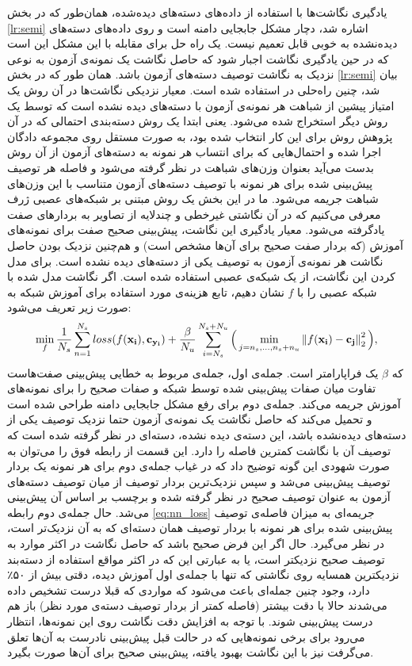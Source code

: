 یادگیری نگاشت‌ها با استفاده از داده‌های دسته‌های دیده‌شده، همان‌طور که در بخش \ref{lr:semi} اشاره شد، دچار مشکل جابجایی دامنه است و  روی داده‌های دسته‌های دیده‌نشده به خوبی قابل تعمیم نیست. یک راه حل برای مقابله با این مشکل این است که در حین یادگیری نگاشت اجبار شود که حاصل نگاشت یک نمونه‌ی آزمون به نوعی نزدیک به نگاشت توصیف دسته‌های آزمون باشد. همان ‌طور که در بخش
\ref{lr:semi}
بیان شد، چنین راه‌حلی در
\cite{Kodirov2015}
استفاده شده است. معیار نزدیکی نگاشت‌ها در آن روش یک امتیاز پیشین از شباهت هر نمونه‌ی آزمون با دسته‌های دیده نشده است که  توسط یک روش دیگر استخراج شده می‌شود. یعنی ابتدا یک روش دسته‌بندی
احتمالی  که در آن پژوهش روش  \cite{lampert09} برای این کار انتخاب شده بود، به صورت مستقل روی مجموعه دادگان اجرا شده و احتمال‌هایی که برای انتساب هر نمونه به دسته‌های آزمون از آن روش بدست می‌آید بعنوان وزن‌های شباهت در نظر گرفته می‌شود و فاصله هر توصیف پیش‌بینی شده برای هر نمونه با توصیف دسته‌های آزمون متناسب با این وزن‌های شباهت جریمه می‌شود.
 ما در این بخش یک روش مبتنی بر شبکه‌های عصبی ژرف معرفی می‌کنیم که در آن نگاشتی غیرخطی و چندلایه از تصاویر به بردارهای صفت یادگرفته می‌شود. معیار یادگیری این نگاشت، پیش‌بینی صحیح صفت برای نمونه‌های آموزش (که بردار صفت صحیح برای آن‌ها مشخص است) و هم‌چنین نزدیک بودن حاصل نگاشت هر نمونه‌ی آزمون به توصیف یکی از دسته‌های دیده نشده است. برای مدل کردن این نگاشت، از یک شبکه‌ی عصبی استفاده شده است. اگر نگاشت مدل شده با شبکه عصبی را با $f$ نشان دهیم، تابع هزینه‌ی مورد استفاده برای آموزش شبکه به صورت زیر تعریف می‌شود:
\begin{equation}
\label{eq:nn_loss}
\min_{f}
\frac{1}{N_s} \sum_{n=1}^{N_s} loss(f(\mathbf{x_i), c_{y_i}}) +
\frac{\beta}{N_u} \sum_{i=N_s}^{N_s+N_u} \Big ( \min_{j=n_s,\ldots,n_s + n_u} \left \lVert f(\mathbf{x_i) - c_j} \right \rVert_2^2 \Big ),
\end{equation}
که $\beta$ یک فراپارامتر است.
جمله‌ی اول، جمله‌ی مربوط به خطایی پیش‌بینی صفت‌هاست تفاوت میان صفات پیش‌بینی شده توسط شبکه و صفات صحیح را برای نمونه‌های آموزش جریمه می‌کند.
 جمله‌ی دوم برای رفع مشکل جابجایی دامنه طراحی شده است و تحمیل می‌کند که حاصل نگاشت یک نمونه‌ی آزمون حتما نزدیک توصیف یکی از دسته‌های دیده‌نشده باشد، این دسته‌ی دیده نشده، دسته‌ای در نظر گرفته شده است که توصیف آن با نگاشت کمترین فاصله را دارد. این قسمت از رابطه فوق را می‌توان به صورت شهودی این گونه توضیح داد که در غیاب جمله‌ی دوم برای هر نمونه یک بردار توصیف پیش‌بینی می‌شد و سپس نزدیک‌ترین بردار توصیف از میان توصیف دسته‌های آزمون به عنوان توصیف صحیح در نظر گرفته شده و برچسب بر اساس آن پیش‌بینی می‌شد. حال جمله‌ی دوم رابطه \eqref{eq:nn_loss} جریمه‌ای به میزان فاصله‌ی توصیف پیش‌بینی شده برای هر نمونه با بردار توصیف همان دسته‌ای که به آن نزدیک‌تر است، در نظر می‌گیرد. حال اگر این فرض صحیح باشد که
 حاصل نگاشت در اکثر موارد به توصیف صحیح نزدیکتر است، یا به عبارتی این که در اکثر مواقع استفاده از دسته‌بند نزدیکترین همسایه روی نگاشتی که تنها با جمله‌ی اول آموزش دیده، دقتی بیش از ۵۰٪ دارد، وجود چنین جمله‌ای باعث می‌شود که مواردی که قبلا درست تشخیص داده می‌شدند حالا با دقت بیشتر (فاصله کمتر از بردار توصیف دسته‌ی مورد نظر) باز هم درست پیش‌بینی شوند. با توجه به افزایش دقت نگاشت روی این نمونه‌ها، انتظار می‌رود برای برخی نمونه‌هایی که در حالت قبل پیش‌بینی نادرست به آن‌ها تعلق می‌گرفت نیز با این نگاشت بهبود یافته، پیش‌بینی صحیح برای آن‌ها صورت بگیرد.

